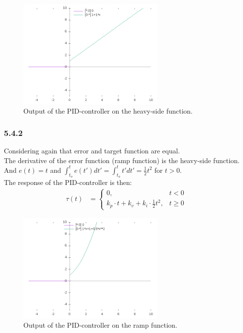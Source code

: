 \begin{figure}[!h]
\centering
\includegraphics[width= 0.65\textwidth ]{task541.png}
\caption{Output of the PID-controller on the heavy-side function.}
\end{figure}

\subsubsection*{5.4.2}

Considering again that error and target function are equal.\\
The derivative of the error function (ramp function) is the heavy-side function.
And $e(t) = t$ and $\int_{t_o}^{t}e(t')dt' = \int_{t_o}^{t}t'dt' = \frac{1}{2}t^2$ for $t > 0$.\\
The response of the PID-controller is then:
\begin{align*}
\tau(t) &= 
\begin{cases}
0, & t < 0\\
k_p \cdot t + k_v + k_i \cdot \frac{1}{2}t^2, & t \ge 0
\end{cases}
\end{align*}

\begin{figure}[!h]
	\centering
	\includegraphics[width= 0.65\textwidth ]{task542.png}
	\caption{Output of the PID-controller on the ramp function.}
\end{figure}




